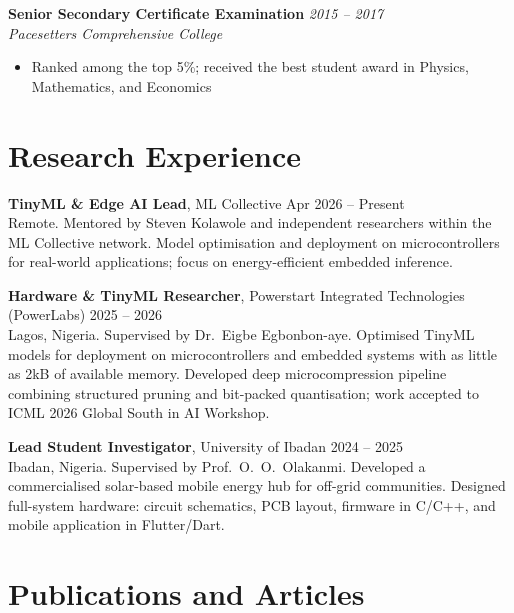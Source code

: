 \documentclass[10pt, a4paper]{article}
\newcommand{\cventry}[4]{%
  \noindent\textbf{#1} \hfill \textit{#2}\\%
  \textit{#3} \hfill \small{#4}\\[-4pt]%
}
\begin{document}
\vspace{4pt}
\cventry{Senior Secondary Certificate Examination}{2015 -- 2017}{Pacesetters Comprehensive College}{}
\begin{itemize}
  \item Ranked among the top 5\%; received the best student award in Physics, Mathematics, and Economics
\end{itemize}

\section{Research Experience}

\noindent\textbf{TinyML \& Edge AI Lead}, ML Collective \hfill Apr 2026 -- Present\\
Remote. Mentored by Steven Kolawole and independent researchers within the ML Collective network.
Model optimisation and deployment on microcontrollers for real-world applications; focus on
energy-efficient embedded inference.

\vspace{6pt}
\noindent\textbf{Hardware \& TinyML Researcher}, Powerstart Integrated Technologies (PowerLabs) \hfill 2025 -- 2026\\
Lagos, Nigeria. Supervised by Dr.\ Eigbe Egbonbon-aye. Optimised TinyML models for deployment on
microcontrollers and embedded systems with as little as 2kB of available memory. Developed deep
microcompression pipeline combining structured pruning and bit-packed quantisation; work accepted
to ICML 2026 Global South in AI Workshop.

\vspace{6pt}
\noindent\textbf{Lead Student Investigator}, University of Ibadan \hfill 2024 -- 2025\\
Ibadan, Nigeria. Supervised by Prof.\ O.\ O.\ Olakanmi. Developed a commercialised solar-based
mobile energy hub for off-grid communities. Designed full-system hardware: circuit schematics,
PCB layout, firmware in C/C++, and mobile application in Flutter/Dart.


\section{Publications and Articles}
\end{document}
